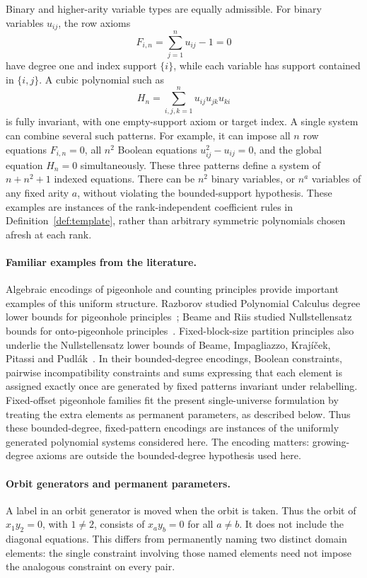 Binary and higher-arity variable types are equally admissible. For
binary variables $u_{ij}$, the row axioms
\[
               F_{i,n}=\sum_{j=1}^{n}u_{ij}-1=0
\]
have degree one and index support $\{i\}$, while each variable has
support contained in $\{i,j\}$. A cubic polynomial such as
\[
       H_n=\sum_{i,j,k=1}^{n}u_{ij}u_{jk}u_{ki}
\]
is fully invariant, with one empty-support axiom or target index.
A single system can combine several such patterns. For example, it can
impose all $n$ row equations $F_{i,n}=0$, all $n^2$ Boolean equations
$u_{ij}^2-u_{ij}=0$, and the global equation $H_n=0$ simultaneously.
These three patterns define a system of $n+n^2+1$ indexed equations.
There can be $n^2$ binary variables, or $n^a$ variables of any fixed
arity $a$, without violating the bounded-support hypothesis. These
examples are instances of the rank-independent coefficient rules in
Definition~\ref{def:template}, rather than arbitrary symmetric
polynomials chosen afresh at each rank.

\paragraph{Familiar examples from the literature.}
Algebraic encodings of pigeonhole and counting principles provide
important examples of this uniform structure. Razborov studied
Polynomial Calculus degree lower bounds for pigeonhole
principles~\cite{RazborovPC}; Beame and Riis studied Nullstellensatz
bounds for onto-pigeonhole principles~\cite{BeameRiis}. Fixed-block-size
partition principles also underlie the Nullstellensatz lower bounds of
Beame, Impagliazzo, Kraj\'{i}\v{c}ek, Pitassi and
Pudl\'{a}k~\cite{NSFoundations}. In their bounded-degree encodings,
Boolean constraints, pairwise incompatibility constraints and sums
expressing that each element is assigned exactly once are generated by
fixed patterns invariant under relabelling. Fixed-offset pigeonhole
families fit the present single-universe formulation by treating the
extra elements as permanent parameters, as described below. Thus these bounded-degree, fixed-pattern encodings are instances of
the uniformly generated polynomial systems considered here.
The encoding matters: growing-degree axioms are outside the
bounded-degree hypothesis used here.

\paragraph{Orbit generators and permanent parameters.}
A label in an orbit generator is moved when the orbit is taken. Thus
the orbit of $x_1y_2=0$, with $1\ne2$, consists of $x_ay_b=0$ for
all $a\ne b$. It does not include the diagonal equations. This differs
from permanently naming two distinct domain elements: the single
constraint involving those named elements need not impose the analogous
constraint on every pair.

